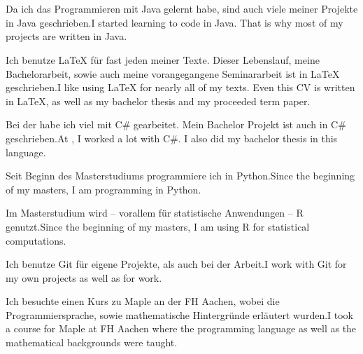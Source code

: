 \section{\skills}
    \cvskillhead[-0.1em]
    
    {\ifgerman Da ich das Programmieren mit Java gelernt habe, sind auch viele meiner Projekte in Java geschrieben.\else I started learning to code in Java. That is why most of my projects are written in Java.\fi}
    
    {\ifgerman Ich benutze \LaTeX{} für fast jeden meiner Texte. Dieser Lebenslauf, meine Bachelorarbeit, sowie auch meine vorangegangene Seminararbeit ist in \LaTeX{} geschrieben.\else I like using \LaTeX{} for nearly all of my texts. Even this CV is written in \LaTeX, as well as my bachelor thesis and my proceeded term paper.\fi}
    
    {\ifgerman Bei der \cae{} habe ich viel mit C\# gearbeitet. Mein Bachelor Projekt ist auch in C\# geschrieben.\else At \cae, I worked a lot with C\#. I also did my bachelor thesis in this language.\fi}
    
    {\ifgerman Seit Beginn des Masterstudiums programmiere ich in Python.\else Since the beginning of my masters, I am programming in Python.\fi}

    {\ifgerman Im Masterstudium wird -- vorallem für statistische Anwendungen -- R genutzt.\else Since the beginning of my masters, I am using R for statistical computations.\fi}

    {\ifgerman Ich benutze Git für eigene Projekte, als auch bei der Arbeit.\else I work with Git for my own projects as well as for work.\fi}
    
    {\ifgerman Ich besuchte einen Kurs zu Maple an der FH Aachen, wobei die Programmiersprache, sowie mathematische Hintergründe erläutert wurden.\else I took a course for Maple at FH Aachen where the programming language as well as the mathematical backgrounds were taught.\fi}
    
